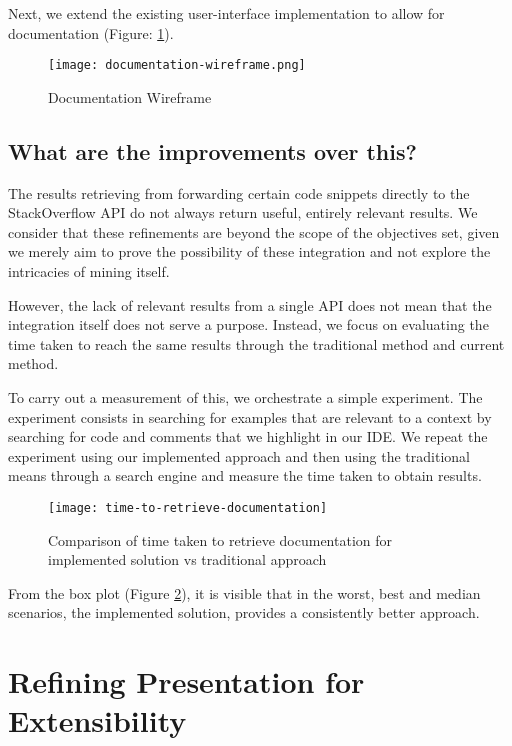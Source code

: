 Next, we extend the existing user-interface implementation to allow for documentation (Figure: \ref{fig:documentationWireframe}).

\begin{figure}[h!]
	\centering
	\texttt{[image: documentation-wireframe.png]}
	\caption{Documentation Wireframe}
	\label{fig:documentationWireframe}
\end{figure}

\subsection{What are the improvements over this?}

The results retrieving from forwarding certain code snippets directly to the StackOverflow API do not always return useful, entirely relevant results. We consider that these refinements are beyond the scope of the objectives set, given we merely aim to prove the possibility of these integration and not explore the intricacies of mining itself.

However, the lack of relevant results from a single API does not mean that the integration itself does not serve a purpose. Instead, we focus on evaluating the time taken to reach the same results through the traditional method and current method.

To carry out a measurement of this, we orchestrate a simple experiment. The experiment consists in searching for examples that are relevant to a context by searching for code and comments that we highlight in our IDE. We repeat the experiment using our implemented approach and then using the traditional means through a search engine and measure the time taken to obtain results.

\begin{figure}[h]
	\centering
	\texttt{[image: time-to-retrieve-documentation]}
	\caption{Comparison of time taken to retrieve documentation for implemented solution vs traditional approach}
	\label{fig:time-to-retrieve-documentation}
\end{figure}

From the box plot (Figure \ref{fig:time-to-retrieve-documentation}), it is visible that in the worst, best and median scenarios, the implemented solution, provides a consistently better approach.

\section{Refining Presentation for Extensibility}

